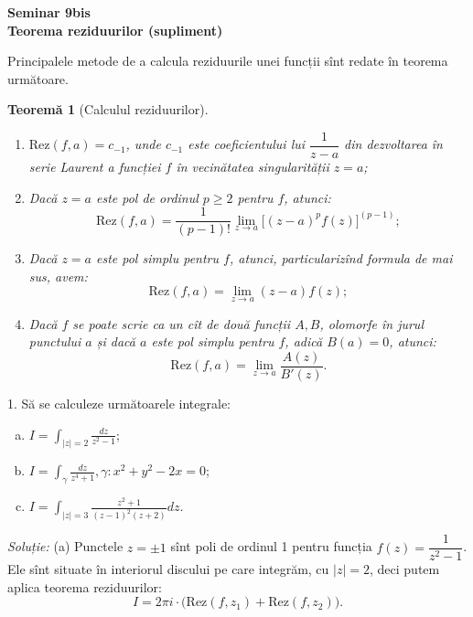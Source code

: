 \documentclass[12pt,a4paper]{article}
\newcommand\ds{\displaystyle}
\newcommand\Rez{\mathrm{Rez}}
\theoremstyle{dotless}
\newtheorem{theorem}{Teorem\u{a}}
\theoremstyle{dotlessdr}
\begin{document}

\begin{center}
  {\large\textbf{Seminar 9bis \\
      Teorema reziduurilor (supliment)}}
\end{center}

\vspace{2cm}

\indent\indent Principalele metode de a calcula reziduurile unei funcții
sînt redate în teorema următoare.

\begin{theorem}[Calculul reziduurilor]\label{thm:calcul-rez}
  \begin{enumerate}[(1)]
  \item $ \Rez(f, a) = c_{-1} $, unde $ c_{-1} $ este coeficientului lui $ \dfrac{1}{z - a} $
    din dezvoltarea în serie Laurent a funcției $ f $ în vecinătatea singularității $ z = a $;
  \item Dacă $ z = a $ este pol de ordinul $ p \geq 2 $ pentru $ f $, atunci:
    \[
      \Rez(f, a) = \frac{1}{(p - 1)!} \lim_{z \to a} \Big[ (z - a)^p f(z) \Big]^{(p-1)};
    \]
  \item Dacă $ z = a $ este pol simplu pentru $ f $, atunci, particularizînd formula
    de mai sus, avem:
    \[
      \Rez(f, a) = \lim_{z \to a} (z - a) f(z);
    \]
  \item Dacă $ f $ se poate scrie ca un cît de două funcții $ A, B $, olomorfe
    în jurul punctului $ a $ și dacă $ a $ este pol simplu pentru $ f $, adică
    $ B(a) = 0 $, atunci:
    \[
      \Rez(f, a) = \lim_{z \to a} \frac{A(z)}{B'(z)}.
    \]
  \end{enumerate}
\end{theorem}

\vspace{1cm}

1. Să se calculeze următoarele integrale:
\begin{enumerate}[(a)]
\item $ I = \ds\int_{|z| = 2} \frac{dz}{z^2 - 1} $;
\item $ I = \ds\int_\gamma \frac{dz}{z^4 + 1}, \gamma: x^2 + y^2 - 2x = 0 $;
\item $ I = \ds\int_{|z| = 3} \frac{z^2 + 1}{(z - 1)^2 (z + 2)} dz $.
\end{enumerate}

\emph{Soluție:} (a) Punctele $ z = \pm 1 $ sînt poli de ordinul 1 pentru
funcția $ f(z) = \dfrac{1}{z^2 - 1} $. Ele sînt situate în interiorul discului pe
care integrăm, cu $ |z| = 2 $, deci putem aplica teorema reziduurilor:
\[
  I = 2 \pi i \cdot \Big( \mathrm{Rez}(f, z_1) + \mathrm{Rez}(f, z_2) \Big).
\]
\end{document}
